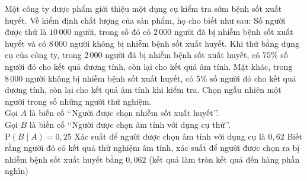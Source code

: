\begin{ex}%
	Một công ty dược phẩm giới thiệu một dụng cụ kiểm tra sớm bệnh sốt xuất huyết. Về kiểm định chất lượng của sản phẩm, họ cho biết như sau: Số người được thử là $10\,000$ người, trong số đó có $2\,000$ người đã bị nhiễm bệnh sốt xuất huyết và có $8\,000$ người không bị nhiễm bệnh sốt xuất huyết. Khi thử bằng dụng cụ của công ty, trong $2\,000$ người đã bị nhiễm bệnh sốt xuất huyết, có $75\%$ số người đó cho kết quả dương tính, còn lại cho kết quả âm tính. Mặt khác, trong $8\,000$ người không bị nhiễm bệnh sốt xuất huyết, có $5\%$ số người đó cho kết quả dương tính, còn lại cho kết quả âm tính khi kiểm tra. Chọn ngẫu nhiên một người trong số những người thử nghiệm.\\
	Gọi $A$ là biến cố \lq\lq Người được chọn nhiễm sốt xuất huyết\rq\rq.\\
	Gọi $B$ là biến cố \lq\lq Người được chọn âm tính với dụng cụ thử\rq\rq.\\
	{\True $\mathrm{P}(B\mid A)=0{,}25$}
	{Xác suất để người được chọn âm tính với dụng cụ là $0{,}62$}
	{\True Biết rằng người đó có kết quả thử nghiệm âm tính, xác suất để người được chọn ra bị nhiễm bệnh sốt xuất huyết bằng $0{,}062$ (kết quả làm tròn kết quả đến hàng phần nghìn)}
\end{ex}

